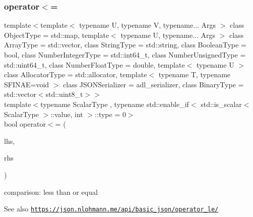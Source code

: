 \subsubsection{\texorpdfstring{operator$<$=}{operator<=}\hspace{0.1cm}{\footnotesize\ttfamily [2/3]}}
{\footnotesize\ttfamily template$<$template$<$ typename U, typename V, typename... Args $>$ class Object\+Type = std\+::map, template$<$ typename U, typename... Args $>$ class Array\+Type = std\+::vector, class String\+Type  = std\+::string, class Boolean\+Type  = bool, class Number\+Integer\+Type  = std\+::int64\+\_\+t, class Number\+Unsigned\+Type  = std\+::uint64\+\_\+t, class Number\+Float\+Type  = double, template$<$ typename U $>$ class Allocator\+Type = std\+::allocator, template$<$ typename T, typename S\+F\+I\+N\+A\+E=void $>$ class J\+S\+O\+N\+Serializer = adl\+\_\+serializer, class Binary\+Type  = std\+::vector$<$std\+::uint8\+\_\+t$>$$>$ \\
template$<$typename Scalar\+Type , typename std\+::enable\+\_\+if$<$ std\+::is\+\_\+scalar$<$ Scalar\+Type $>$\+::value, int $>$\+::type  = 0$>$ \\
bool operator$<$= (\begin{DoxyParamCaption}\item[{\hyperlink{classnlohmann_1_1basic__json_ab8a1c33ee7b154fc41ca2545aa9724e6}{const\+\_\+reference}}]{lhs,  }\item[{Scalar\+Type}]{rhs }\end{DoxyParamCaption})\hspace{0.3cm}{\ttfamily [friend]}}



comparison\+: less than or equal 

\begin{DoxySeeAlso}{See also}
\href{https://json.nlohmann.me/api/basic_json/operator_le/}{\tt https\+://json.\+nlohmann.\+me/api/basic\+\_\+json/operator\+\_\+le/} 
\end{DoxySeeAlso}
\mbox{\label{classnlohmann_1_1basic__json_a4e96b98c1f8dfccaaa94aa0d5e77427c}} 
